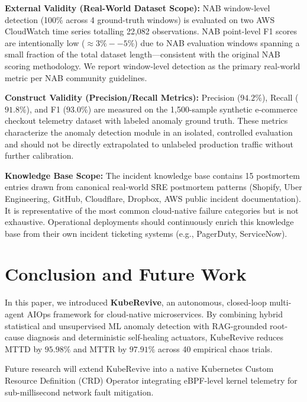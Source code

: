 \documentclass[conference]{IEEEtran}
\begin{document}
\textbf{External Validity (Real-World Dataset Scope):} NAB window-level detection (100\% across 4 ground-truth windows) is evaluated on two AWS CloudWatch time series totalling 22,082 observations. NAB point-level F1 scores are intentionally low ($\approx 3\%--5\%$) due to NAB evaluation windows spanning a small fraction of the total dataset length---consistent with the original NAB scoring methodology. We report window-level detection as the primary real-world metric per NAB community guidelines.

\textbf{Construct Validity (Precision/Recall Metrics):} Precision ($94.2\%$), Recall ($91.8\%$), and F1 ($93.0\%$) are measured on the 1,500-sample synthetic e-commerce checkout telemetry dataset with labeled anomaly ground truth. These metrics characterize the anomaly detection module in an isolated, controlled evaluation and should not be directly extrapolated to unlabeled production traffic without further calibration.

\textbf{Knowledge Base Scope:} The incident knowledge base contains 15 postmortem entries drawn from canonical real-world SRE postmortem patterns (Shopify, Uber Engineering, GitHub, Cloudflare, Dropbox, AWS public incident documentation). It is representative of the most common cloud-native failure categories but is not exhaustive. Operational deployments should continuously enrich this knowledge base from their own incident ticketing systems (e.g., PagerDuty, ServiceNow).

\section{Conclusion and Future Work}
In this paper, we introduced \textbf{KubeRevive}, an autonomous, closed-loop multi-agent AIOps framework for cloud-native microservices. By combining hybrid statistical and unsupervised ML anomaly detection with RAG-grounded root-cause diagnosis and deterministic self-healing actuators, KubeRevive reduces MTTD by $95.98\%$ and MTTR by $97.91\%$ across 40 empirical chaos trials.

Future research will extend KubeRevive into a native Kubernetes Custom Resource Definition (CRD) Operator integrating eBPF-level kernel telemetry for sub-millisecond network fault mitigation.



\end{document}
